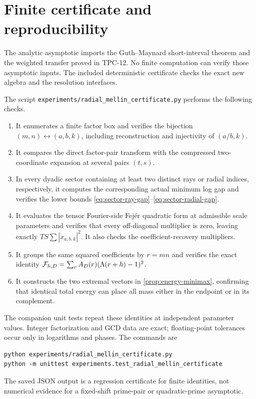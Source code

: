 \section{Finite certificate and reproducibility}
\label{sec:computation}

The analytic asymptotic imports the Guth--Maynard short-interval theorem
and the weighted transfer proved in TPC-12.  No finite computation can
verify those asymptotic inputs.  The included deterministic certificate
checks the exact new algebra and the resolution interfaces.

The script \texttt{experiments/radial\_mellin\_certificate.py} performs
the following checks.

\begin{enumerate}[label=\textup{(\roman*)}]
 \item It enumerates a finite factor box and verifies the bijection
 $(m,n)\leftrightarrow(a,b,k)$, including reconstruction and injectivity
 of $(a/b,k)$.

 \item It compares the direct factor-pair transform with the compressed
 two-coordinate expansion at several pairs $(t,s)$.

 \item In every dyadic sector containing at least two distinct rays or
 radial indices, respectively, it computes the corresponding actual
 minimum log gap and verifies the lower bounds
 \eqref{eq:sector-ray-gap}--\eqref{eq:sector-radial-gap}.

 \item It evaluates the tensor Fourier-side Fej\'er quadratic form at
 admissible scale parameters and verifies that every off-diagonal multiplier
 is zero, leaving exactly $TS\sum|x_{a,b,k}|^2$.  It also checks the
 coefficient-recovery multipliers.

 \item It groups the same squared coefficients by $r=mn$ and verifies
 the exact identity
 $\mathcal F_{h,D}=\sum_rA_D(r)(\Lambda(r+h)-1)^2$.

 \item It constructs the two extremal vectors in
 \cref{prop:energy-minimax}, confirming that identical total energy can
 place all mass either in the endpoint or in its complement.
\end{enumerate}

The companion unit tests repeat these identities at independent
parameter values.  Integer factorization and GCD data are exact;
floating-point tolerances occur only in logarithms and phases.  The
commands are
\begin{verbatim}
python experiments/radial_mellin_certificate.py
python -m unittest experiments.test_radial_mellin_certificate
\end{verbatim}
The saved JSON output is a regression certificate for finite identities,
not numerical evidence for a fixed-shift prime-pair or quadratic-prime
asymptotic.

